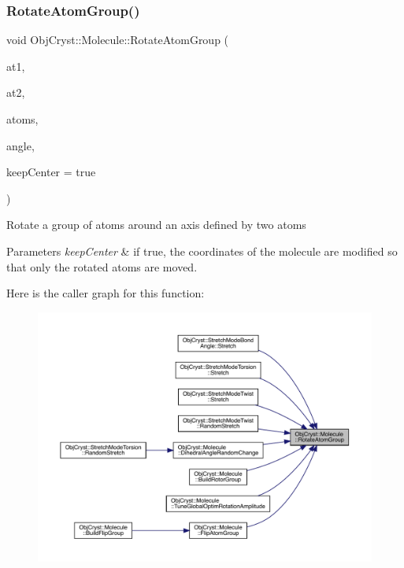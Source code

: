 \subsubsection{\texorpdfstring{RotateAtomGroup()}{RotateAtomGroup()}\hspace{0.1cm}{\footnotesize\ttfamily [1/2]}}
{\footnotesize\ttfamily void Obj\+Cryst\+::\+Molecule\+::\+Rotate\+Atom\+Group (\begin{DoxyParamCaption}\item[{const \mbox{\hyperlink{class_obj_cryst_1_1_mol_atom}{Mol\+Atom}} \&}]{at1,  }\item[{const \mbox{\hyperlink{class_obj_cryst_1_1_mol_atom}{Mol\+Atom}} \&}]{at2,  }\item[{const set$<$ \mbox{\hyperlink{class_obj_cryst_1_1_mol_atom}{Mol\+Atom}} $\ast$ $>$ \&}]{atoms,  }\item[{const R\+E\+AL}]{angle,  }\item[{const bool}]{keep\+Center = {\ttfamily true} }\end{DoxyParamCaption})}

Rotate a group of atoms around an axis defined by two atoms


\begin{DoxyParams}{Parameters}
{\em keep\+Center} & if true, the coordinates of the molecule are modified so that only the rotated atoms are moved. \\
\hline
\end{DoxyParams}
Here is the caller graph for this function\+:
\nopagebreak
\begin{figure}[H]
\begin{center}
\leavevmode
\includegraphics[width=350pt]{class_obj_cryst_1_1_molecule_a9bd595a0ad88d6832718f3bffb452866_icgraph}
\end{center}
\end{figure}
\mbox{\label{class_obj_cryst_1_1_molecule_a84e93db5b81b90fd5befa22caaf8691c}} 
